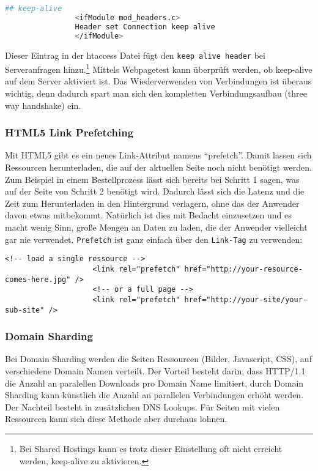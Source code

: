 			\begin{lstlisting}[captionpos=b, caption=htaccess Eintrag nach \autocite{sextonAlive}, label=lst:keepAlive, language=bash]
				## keep-alive
				<ifModule mod_headers.c> 
				Header set Connection keep alive
				</ifModule>
			\end{lstlisting}
				
			Dieser Eintrag in der htaccess Datei fügt den \texttt{keep alive header} bei Serveranfragen hinzu.\footnote{Bei Shared Hostings kann es trotz dieser Einstellung oft nicht erreicht werden, keep-alive zu aktivieren.} Mittels Webpagetest kann überprüft werden, ob keep-alive auf dem Server aktiviert ist. Das Wiederverwenden von Verbindungen ist überaus wichtig, denn dadurch spart man sich den kompletten Verbindungsaufbau (three way handshake) ein.



			\subsubsection{HTML5 Link Prefetching} %
			\label{ssub:html5_link_prefetching}
				Mit HTML5 gibt es ein neues Link-Attribut namens "`prefetch"'. Damit lassen sich Ressourcen herunterladen, die auf der aktuellen Seite noch nicht benötigt werden. Zum Beispiel in einem Bestellprozess lässt sich bereits bei Schritt 1 sagen, was auf der Seite von Schritt 2 benötigt wird. Dadurch lässt sich die Latenz und die Zeit zum Herunterladen in den Hintergrund verlagern, ohne das der Anwender davon etwas mitbekommt. Natürlich ist dies mit Bedacht einzusetzen und es macht wenig Sinn, große Mengen an Daten zu laden, die der Anwender vielleicht gar nie verwendet. \texttt{Prefetch} ist ganz einfach über den \texttt{Link-Tag} zu verwenden:
				\begin{lstlisting}[captionpos=b, caption=Prefetching via Link-Tag, label=lst:prefetch]
					<!-- load a single ressource -->
					<link rel="prefetch" href="http://your-resource-comes-here.jpg" />
					<!-- or a full page -->
					<link rel="prefetch" href="http://your-site/your-sub-site" />
				\end{lstlisting}
				
			


			\subsubsection{Domain Sharding} %
			\label{ssub:domain_sharding}
				Bei Domain Sharding werden die Seiten Ressourcen (Bilder, Javascript, CSS), auf verschiedene Domain Namen verteilt. Der Vorteil besteht darin, dass HTTP/1.1 die Anzahl an paralellen Downloads pro Domain Name limitiert, durch Domain Sharding kann künstlich die Anzahl an parallelen Verbindungen erhöht werden. Der Nachteil besteht in zusätzlichen DNS Lookups. Für Seiten mit vielen Ressourcen kann sich diese Methode aber durchaus lohnen.
			

